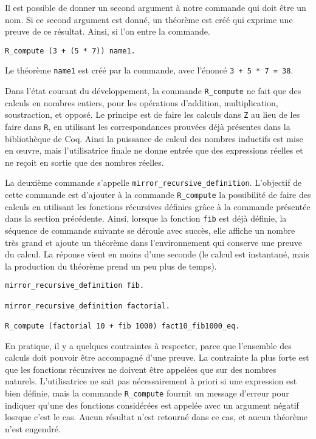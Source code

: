 \documentclass[draft]{jflart}
\begin{document}
Il est possible de donner un second argument à notre commande qui doit
être un nom.  Si ce second argument est donné, un théorème est créé
qui exprime une preuve de ce résultat.  Ainsi, si l'on entre la
commande.
\begin{verbatim}
R_compute (3 + (5 * 7)) name1.
\end{verbatim}
Le théorème \texttt{name1} est créé par la commande, avec l'énoncé \texttt{3
  + 5 * 7 = 38}.

Dans l'état courant du développement, la commande \texttt{R\_compute}
ne fait que des calculs en nombres entiers, pour les opérations
d'addition, multiplication, soustraction, et opposé.  Le principe est
de faire les calculs dans \texttt{Z} au lieu de les faire dans \texttt{R},
en utilisant les correspondances prouvées déjà présentes dans la
bibliothèque de Coq.  Ainsi la puissance de calcul des nombres
inductifs est mise en œuvre, mais l'utilisatrice finale ne donne
entrée que des expressions réelles et ne reçoit en sortie que des
nombres réelles.

La deuxième commande s'appelle \texttt{mirror\_recursive\_definition}.
L'objectif de cette commande est d'ajouter à la commande
\texttt{R\_compute} la possibilité de faire des calculs en utilisant
les fonctions récursives définies grâce à la commande présentée dans
la section précédente.  Ainsi, lorsque la fonction \texttt{fib} est
déjà définie, la séquence de commande suivante se déroule avec succès,
elle affiche un nombre très grand et ajoute un théorème dans
l'environnement qui conserve une preuve du calcul.  La réponse vient
en moins d'une seconde (le calcul est instantané, mais la production
du théorème prend un peu plus de temps).
\begin{verbatim}
mirror_recursive_definition fib.

mirror_recursive_definition factorial.

R_compute (factorial 10 + fib 1000) fact10_fib1000_eq.
\end{verbatim}
En pratique, il y a quelques contraintes à respecter, parce que
l'ensemble des calculs doit pouvoir être accompagné d'une preuve.  La
contrainte la plus forte est que les fonctions récursives ne doivent
être appelées que sur des nombres naturels.  L'utilisatrice ne sait
pas nécessairement à priori si une expression est bien définie, mais
la commande \texttt{R\_compute} fournit un message d'erreur pour indiquer
qu'une des fonctions considérées est appelée avec un argument négatif
losrque c'est le cas.  Aucun résultat n'est retourné dans ce cas, et
aucun théorème n'est engendré.
\end{document}
